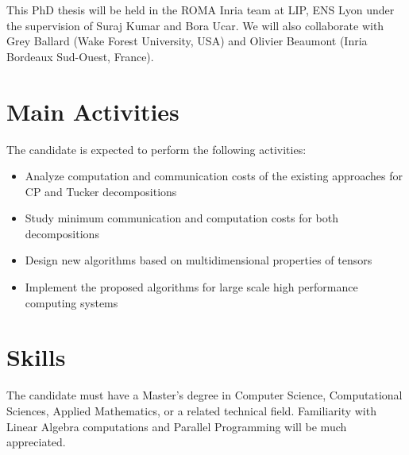 \documentclass[a4paper]{article}
\begin{document}
This PhD thesis will be held in the ROMA Inria team at LIP, ENS Lyon under the supervision of Suraj Kumar and Bora Ucar. We will also collaborate with Grey Ballard (Wake Forest University, USA) and Olivier Beaumont (Inria Bordeaux Sud-Ouest, France).

\section*{Main Activities}

The candidate is expected to perform the following activities:
\begin{itemize}
	\item Analyze computation and communication costs of the existing approaches for CP and Tucker decompositions
	\item Study minimum communication and computation costs for both decompositions
	\item Design new algorithms based on multidimensional properties of tensors
	\item Implement the proposed algorithms for large scale high performance computing systems
\end{itemize}

\section*{Skills}

The candidate must have a Master's degree  in Computer Science, Computational Sciences, Applied Mathematics, or a related technical field.\newline
Familiarity with Linear Algebra computations and Parallel Programming will be much appreciated. 



\end{document}
